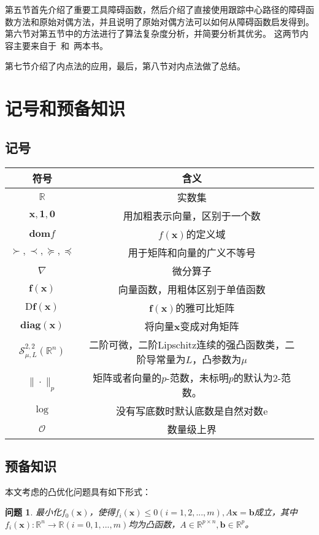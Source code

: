 \documentclass{article}
\newtheorem{problem}{问题}
\begin{document}
第五节首先介绍了重要工具障碍函数，然后介绍了直接使用跟踪中心路径的障碍函数方法和原始对偶方法，并且说明了原始对偶方法可以如何从障碍函数启发得到。第六节对第五节中的方法进行了算法复杂度分析，并简要分析其优劣。
这两节内容主要来自于~\cite{10.5555/993483}和~\cite{nesterov2018lectures}两本书。

第七节介绍了内点法的应用，最后，第八节对内点法做了总结。
\section{记号和预备知识}
\subsection{记号}
\begin{center}
    \begin{tabular}{ c c c }
     符号 & 含义 \\ 
     \hline
     $\mathbb{R}$ & 实数集\\  
     $\bm x,\bm 1,\bm 0$ & 用加粗表示向量，区别于一个数\\
     $\textbf{dom}f$ & $f(\bm x)$的定义域  \\
     $\succ,\prec,\succeq,\preceq$ & 用于矩阵和向量的广义不等号\\
     $\nabla$ & 微分算子\\
     $\textbf{f}(\bm x)$& 向量函数，用粗体区别于单值函数 \\
     $\text{D}\textbf{f}(\bm x)$&$\textbf{f}(\bm x)$的雅可比矩阵\\
     $\textbf{diag}(\bm x)$ & 将向量$\bm x$变成对角矩阵\\
     $\mathcal{S}_{\mu,L}^{2,2}(\mathbb{R}^n)$ & 二阶可微，二阶Lipschitz连续的强凸函数类，二阶导常量为$L$，凸参数为$\mu$\\
     $\|\cdot\|_p$ & 矩阵或者向量的$p$-范数，未标明$p$的默认为$2$-范数。\\
     $\log$ & 没有写底数时默认底数是自然对数$\text{e}$\\
     $\mathcal O$ & 数量级上界\\
    \end{tabular}
\end{center}
\subsection{预备知识}
\label{pre_know}
本文考虑的凸优化问题具有如下形式：
\begin{problem}
最小化$f_0(\bm x)$，使得$f_i(\bm x)\le 0(i=1,2,...,m),A\bm x=\bm{b}$成立，其中$f_i(\bm x):\mathbb{R}^n\rightarrow\mathbb{R}(i=0,1,...,m)$均为凸函数，$A\in\mathbb{R}^{p\times n},\bm b\in\mathbb{R}^p$。
\label{general_convex_prob}
\end{problem}
\end{document}
